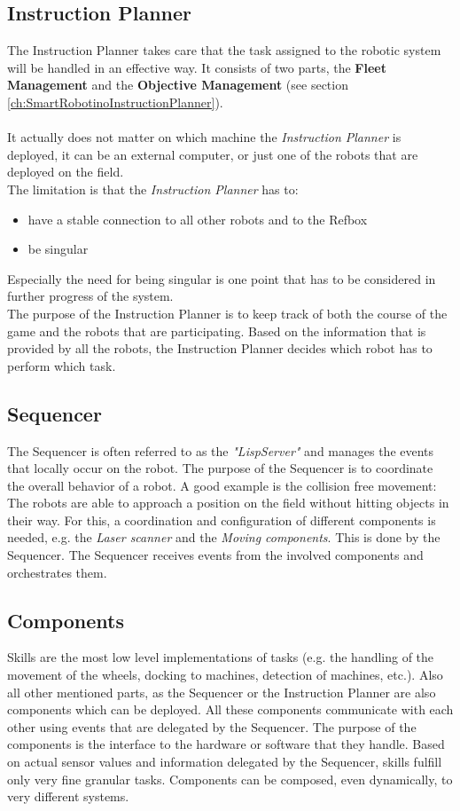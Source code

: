 \subsection{Instruction Planner}
The Instruction Planner takes care that the task assigned to the robotic system will be handled in an effective way. It consists of two parts, the \textbf{Fleet Management} and the \textbf{Objective Management} (see section \ref{ch:SmartRobotinoInstructionPlanner}). \\
\\
It actually does not matter on which machine the \textit{Instruction Planner} is deployed, it can be an external computer, or just one of the robots that are deployed on the field.\\
The limitation is that the \textit{Instruction Planner} has to:
\begin{itemize}
    \item have a stable connection to all other robots and to the Refbox
    \item be singular
\end{itemize}
Especially the need for being singular is one point that has to be considered in further progress of the system.
\\
The purpose of the Instruction Planner is to keep track of both the course of the game and the robots that are participating.
Based on the information that is provided by all the robots, the Instruction Planner decides which robot has to perform which task.

\subsection{Sequencer}
The Sequencer is often referred to as the \textit{"LispServer"} and manages the events that locally occur on the robot. The purpose of the Sequencer is to coordinate the overall behavior 
of a robot. 
A good example is the collision free movement: The robots are able to approach a position on the field without hitting objects in their way. For this, a coordination and configuration of different components is needed, 
e.g. the \textit{Laser scanner} and the \textit{Moving components}. This is done by the Sequencer. The Sequencer receives events from the involved components and orchestrates them.

\subsection{Components}
Skills are the most low level implementations of tasks (e.g. the handling of the movement of the wheels, docking to machines, detection of machines, etc.).
Also all other mentioned parts, as the Sequencer or the Instruction Planner are also components which can be deployed.
All these components communicate with each other using events that are delegated by the Sequencer.
The purpose of the components is the interface to the hardware or software that they handle.
Based on actual sensor values and information delegated by the Sequencer, skills fulfill only very fine granular tasks. Components can be composed, even dynamically, to very different systems.

